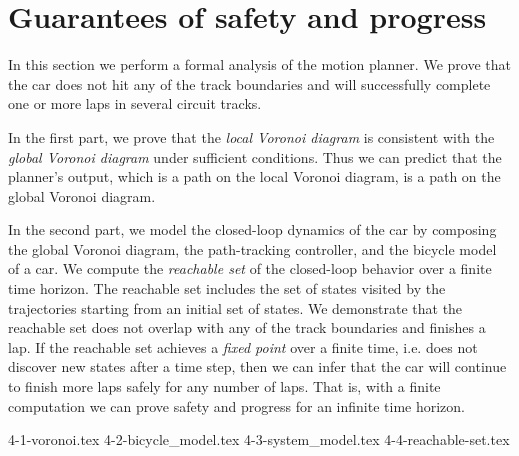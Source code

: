 \section{Guarantees of safety and progress}
\label{sec:guarantees}

In this section we perform a formal analysis of the motion planner.
%
We prove that the car does not hit any of the track boundaries and will successfully complete one or more laps in several circuit tracks.


In the first part, we prove that the \emph{local Voronoi diagram} is consistent with the \emph{global Voronoi diagram} under sufficient conditions.
%
Thus we can predict that the planner's output, which is a path on the local Voronoi diagram, is a path on the global Voronoi diagram.


In the second part, we model the closed-loop dynamics of the car by composing the global Voronoi diagram, the path-tracking controller, and the bicycle model of a car.
%
We compute the \emph{reachable set} of the closed-loop behavior over a finite time horizon.
%
The reachable set includes the set of states visited by the trajectories starting from an initial set of states.
%
We demonstrate that the reachable set does not overlap with any of the track boundaries and finishes a lap.
%
If the reachable set achieves a \emph{fixed point} over a finite time, i.e. does not discover new states after a time step, then we can infer that the car will continue to finish more laps safely for any number of laps.
%
That is, with a finite computation we can prove safety and progress for an infinite time horizon.

{4-1-voronoi.tex}
{4-2-bicycle_model.tex}
{4-3-system_model.tex}
{4-4-reachable-set.tex}


